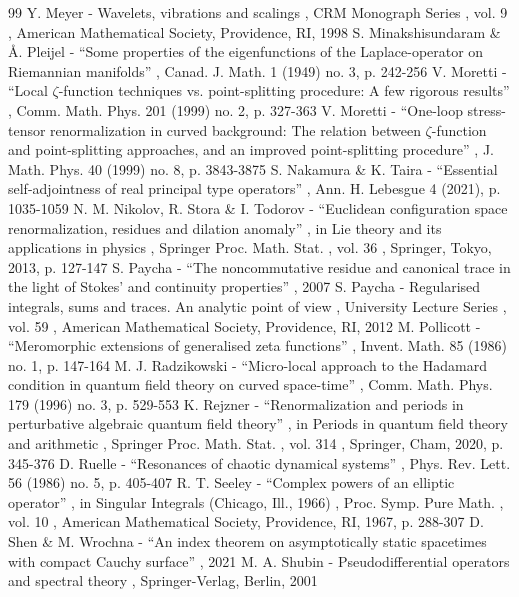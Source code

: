\documentclass[10pt]{amsart}
\theoremstyle{definition}
\begin{document}
\begin{thebibliography}{99}
 Y. Meyer - Wavelets, vibrations and scalings , CRM Monograph Series , vol. 9 , American Mathematical Society, Providence, RI, 1998
 S. Minakshisundaram \& Å. Pleijel - “Some properties of the eigenfunctions of the Laplace-operator on Riemannian manifolds” , Canad. J. Math. 1 (1949) no. 3, p. 242-256
 V. Moretti - “Local $\zeta $-function techniques vs. point-splitting procedure: A few rigorous results” , Comm. Math. Phys. 201 (1999) no. 2, p. 327-363
 V. Moretti - “One-loop stress-tensor renormalization in curved background: The relation between $\zeta $-function and point-splitting approaches, and an improved point-splitting procedure” , J. Math. Phys. 40 (1999) no. 8, p. 3843-3875
 S. Nakamura \& K. Taira - “Essential self-adjointness of real principal type operators” , Ann. H. Lebesgue 4 (2021), p. 1035-1059
 N. M. Nikolov, R. Stora \& I. Todorov - “Euclidean configuration space renormalization, residues and dilation anomaly” , in Lie theory and its applications in physics , Springer Proc. Math. Stat. , vol. 36 , Springer, Tokyo, 2013, p. 127-147
 S. Paycha - “The noncommutative residue and canonical trace in the light of Stokes’ and continuity properties” , 2007
 S. Paycha - Regularised integrals, sums and traces. An analytic point of view , University Lecture Series , vol. 59 , American Mathematical Society, Providence, RI, 2012
 M. Pollicott - “Meromorphic extensions of generalised zeta functions” , Invent. Math. 85 (1986) no. 1, p. 147-164
 M. J. Radzikowski - “Micro-local approach to the Hadamard condition in quantum field theory on curved space-time” , Comm. Math. Phys. 179 (1996) no. 3, p. 529-553
 K. Rejzner - “Renormalization and periods in perturbative algebraic quantum field theory” , in Periods in quantum field theory and arithmetic , Springer Proc. Math. Stat. , vol. 314 , Springer, Cham, 2020, p. 345-376
 D. Ruelle - “Resonances of chaotic dynamical systems” , Phys. Rev. Lett. 56 (1986) no. 5, p. 405-407
 R. T. Seeley - “Complex powers of an elliptic operator” , in Singular Integrals (Chicago, Ill., 1966) , Proc. Symp. Pure Math. , vol. 10 , American Mathematical Society, Providence, RI, 1967, p. 288-307
 D. Shen \& M. Wrochna - “An index theorem on asymptotically static spacetimes with compact Cauchy surface” , 2021
 M. A. Shubin - Pseudodifferential operators and spectral theory , Springer-Verlag, Berlin, 2001

\end{thebibliography}
\end{document}
